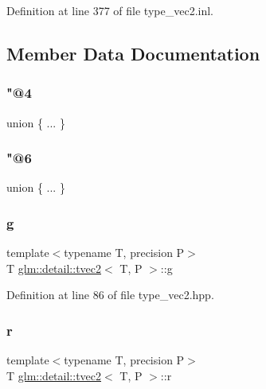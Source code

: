 Definition at line 377 of file type\+\_\+vec2.\+inl.



\subsection{Member Data Documentation}
\mbox{\label{structglm_1_1detail_1_1tvec2_a7976f390b8ec3bf6faa1579fd9a9f521}} 
\subsubsection{\texorpdfstring{"@4}{@4}}
{\footnotesize\ttfamily union \{ ... \} }

\mbox{\label{structglm_1_1detail_1_1tvec2_ac63ffc7438dccaba72e818e00be84ca0}} 
\subsubsection{\texorpdfstring{"@6}{@6}}
{\footnotesize\ttfamily union \{ ... \} }

\mbox{\label{structglm_1_1detail_1_1tvec2_a31ec73176d013596e098adebc33d80f1}} 
\subsubsection{\texorpdfstring{g}{g}}
{\footnotesize\ttfamily template$<$typename T, precision P$>$ \\
T \hyperlink{structglm_1_1detail_1_1tvec2}{glm\+::detail\+::tvec2}$<$ T, P $>$\+::g}



Definition at line 86 of file type\+\_\+vec2.\+hpp.

\mbox{\label{structglm_1_1detail_1_1tvec2_a48526371c2978bcc09ee8121f9babd83}} 
\subsubsection{\texorpdfstring{r}{r}}
{\footnotesize\ttfamily template$<$typename T, precision P$>$ \\
T \hyperlink{structglm_1_1detail_1_1tvec2}{glm\+::detail\+::tvec2}$<$ T, P $>$\+::r}



